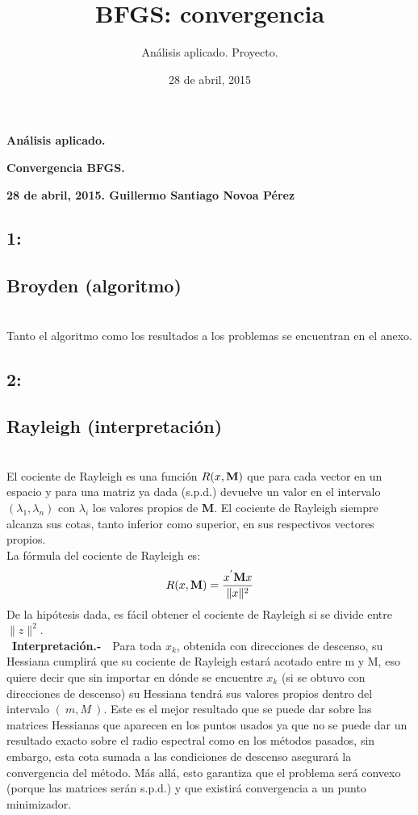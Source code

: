 \documentclass[12pt]{article}
\newcommand{\noi}{\noindent}
\begin{document}
\title{BFGS: convergencia}
\author{An\'alisis aplicado. Proyecto.}
\date{28 de abril, 2015}

\centerline{\large \bf An\'alisis aplicado.}
\centerline{\large \bf Convergencia BFGS.}
\centerline{\bf 28 de abril, 2015. Guillermo Santiago Novoa P\'erez}
\subsection*{1:}
\subsection*{Broyden (algoritmo)}
\noi\\
\noi Tanto el algoritmo como los resultados a los problemas se encuentran en el anexo.
\subsection*{2:}
\subsection*{Rayleigh (interpretaci\'on)}
\noi\\
\noi El cociente de Rayleigh es una funci\'on $R(x,{\bf M})$ que para cada vector en un espacio y para una matriz ya dada (s.p.d.) devuelve un valor en el intervalo $(\lambda_1,\lambda_n)$ con $\lambda_i$ los valores propios de {\bf M}. El cociente de Rayleigh siempre alcanza sus cotas, tanto inferior como superior, en sus respectivos vectores propios.\\
\noi La f\'ormula del cociente de Rayleigh es:
$$R(x,{\bf M}) = \frac{x^{'}{\bf M}x}{\|x\|^2}$$
\noi De la hip\'otesis dada, es f\'acil obtener el cociente de Rayleigh si se divide entre $\|z\|^2$.\\

\ {\bf Interpretaci\'on.-}\ \ 
\noi Para toda $x_k$, obtenida con direcciones de descenso, su Hessiana cumplir\'a que su cociente de Rayleigh estar\'a acotado entre m y M, eso quiere decir que sin importar en d\'onde se encuentre $x_k$ (si se obtuvo con direcciones de descenso) su Hessiana tendr\'a sus valores propios dentro del intervalo $ (\ m,M\ )$. Este es el mejor resultado que se puede dar sobre las matrices Hessianas que aparecen en los puntos usados ya que no se puede dar un resultado exacto sobre el radio espectral como en los m\'etodos pasados, sin embargo, esta cota sumada a las condiciones de descenso asegurar\'a la convergencia del m\'etodo. M\'as all\'a, esto garantiza que el problema ser\'a convexo (porque las matrices ser\'an s.p.d.) y que existir\'a convergencia a un punto minimizador.
\end{document}
